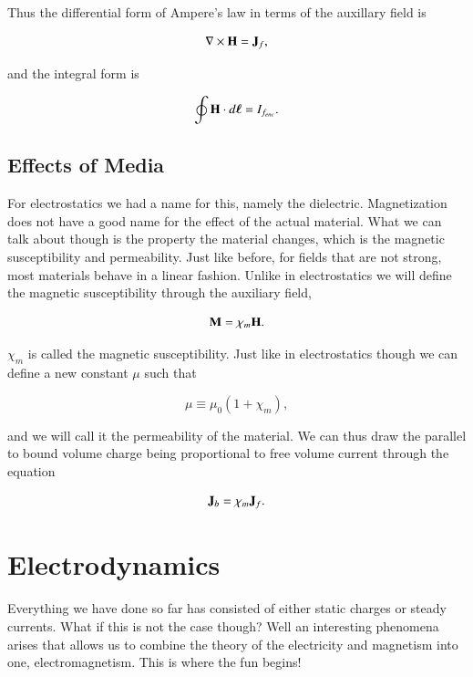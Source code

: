 \documentclass[preprint, review,12pt]{elsarticle}
\def\x{\times}
\def\.{\cdot}
\def\b{\textbf}
\def\bell{\bm{\ell}}
\def\={\equiv}
\def\curl{\nabla \x}
\begin{document}
Thus the differential form of Ampere's law in terms of the auxillary field is

\begin{equation}
    \curl \b H = \b J_f,
\end{equation}

and the integral form is

\begin{equation}
    \oint \b H \. d \bell = I_{f_{enc}}.
\end{equation}

\subsection{Effects of Media}

For electrostatics we had a name for this, namely the dielectric. Magnetization does not have a good name for the effect of the actual material. What we can talk about though is the property the material changes, which is the magnetic susceptibility and permeability. Just like before, for fields that are not strong, most materials behave in a linear fashion. Unlike in electrostatics we will define the magnetic susceptibility through the auxiliary field,

\begin{equation}
    \b M = \chi_m \b H.
\end{equation}

$\chi_m$ is called the magnetic susceptibility. Just like in electrostatics though we can define a new constant $\mu$ such that

\begin{equation}
    \mu \= \mu_0(1+\chi_m),
\end{equation}

and we will call it the permeability of the material. We can thus draw the parallel to bound volume charge being proportional to free volume current through the equation

\begin{equation}
    \b J_b = \chi_m \b J_f.
\end{equation}

\section{Electrodynamics}

Everything we have done so far has consisted of either static charges or steady currents. What if this is not the case though? Well an interesting phenomena arises that allows us to combine the theory of the electricity and magnetism into one, electromagnetism. This is where the fun begins!
\end{document}
